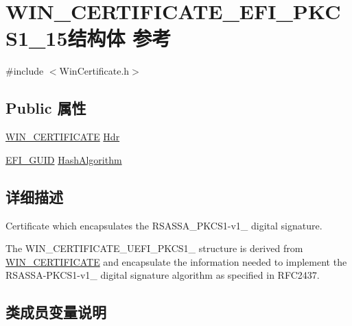 \hypertarget{struct_w_i_n___c_e_r_t_i_f_i_c_a_t_e___e_f_i___p_k_c_s1__15}{}\section{W\+I\+N\+\_\+\+C\+E\+R\+T\+I\+F\+I\+C\+A\+T\+E\+\_\+\+E\+F\+I\+\_\+\+P\+K\+C\+S1\+\_\+15结构体 参考}
\label{struct_w_i_n___c_e_r_t_i_f_i_c_a_t_e___e_f_i___p_k_c_s1__15}


{\ttfamily \#include $<$Win\+Certificate.\+h$>$}

\subsection*{Public 属性}
\begin{DoxyCompactItemize}
\item 
\hyperlink{struct_w_i_n___c_e_r_t_i_f_i_c_a_t_e}{W\+I\+N\+\_\+\+C\+E\+R\+T\+I\+F\+I\+C\+A\+TE} \hyperlink{struct_w_i_n___c_e_r_t_i_f_i_c_a_t_e___e_f_i___p_k_c_s1__15_a42352d4c15c40f7a17027f46f83e332e}{Hdr}
\item 
\hyperlink{_uefi_base_type_8h_ad87614428813f71edb2c2d802e9ce2af}{E\+F\+I\+\_\+\+G\+U\+ID} \hyperlink{struct_w_i_n___c_e_r_t_i_f_i_c_a_t_e___e_f_i___p_k_c_s1__15_aca37a33893d87b9742b53d78cf47f717}{Hash\+Algorithm}
\end{DoxyCompactItemize}


\subsection{详细描述}
Certificate which encapsulates the R\+S\+A\+S\+S\+A\+\_\+\+P\+K\+C\+S1-\/v1\+\_ digital signature.

The W\+I\+N\+\_\+\+C\+E\+R\+T\+I\+F\+I\+C\+A\+T\+E\+\_\+\+U\+E\+F\+I\+\_\+\+P\+K\+C\+S1\+\_ structure is derived from \hyperlink{struct_w_i_n___c_e_r_t_i_f_i_c_a_t_e}{W\+I\+N\+\_\+\+C\+E\+R\+T\+I\+F\+I\+C\+A\+TE} and encapsulate the information needed to implement the R\+S\+A\+S\+S\+A-\/\+P\+K\+C\+S1-\/v1\+\_ digital signature algorithm as specified in R\+F\+C2437. 

\subsection{类成员变量说明}
\mbox{\label{struct_w_i_n___c_e_r_t_i_f_i_c_a_t_e___e_f_i___p_k_c_s1__15_aca37a33893d87b9742b53d78cf47f717}} 
